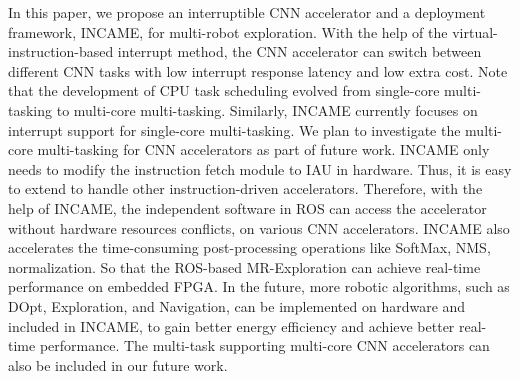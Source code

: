 \label{sec:conclusion}

In this paper, we propose an interruptible CNN accelerator and a deployment framework, INCAME, for multi-robot exploration. 
With the help of the virtual-instruction-based interrupt method, the CNN accelerator can switch between different CNN tasks with low interrupt response latency and low extra cost. Note that the development of CPU task scheduling evolved from single-core multi-tasking to multi-core multi-tasking. Similarly, INCAME currently focuses on interrupt support for single-core multi-tasking. We plan to investigate the multi-core multi-tasking for CNN accelerators as part of future work.
INCAME only needs to modify the instruction fetch module to IAU in hardware. Thus, it is easy to extend to handle other instruction-driven accelerators.
Therefore, with the help of INCAME, the independent software in ROS can access the accelerator without hardware resources conflicts, on various CNN accelerators.
INCAME also accelerates the time-consuming post-processing operations like SoftMax, NMS, normalization.
So that the ROS-based MR-Exploration can achieve real-time performance on embedded FPGA. In the future, more robotic algorithms, such as DOpt, Exploration, and Navigation, can be implemented on hardware and included in INCAME, to gain better energy efficiency and achieve better real-time performance. The multi-task supporting multi-core CNN accelerators can also be included in our future work.

